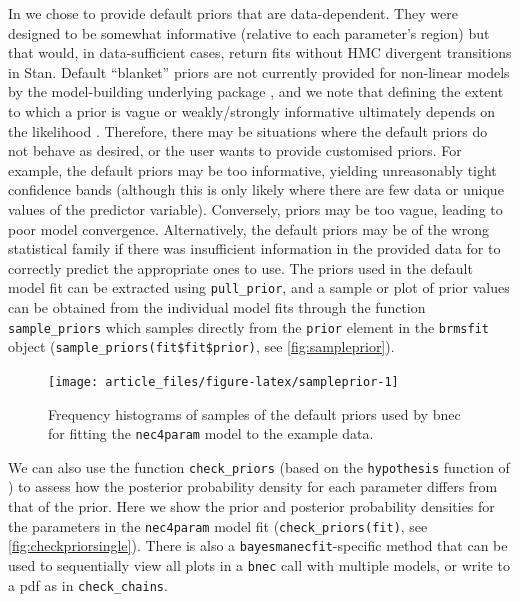 \documentclass[
  shortnames]{jss}
\begin{document}
In  we chose to provide default priors that are data-dependent. They were designed to be somewhat informative (relative to each parameter's region) but that would, in data-sufficient cases, return fits without HMC divergent transitions in Stan. Default ``blanket'' priors are not currently provided for non-linear models by the model-building underlying package , and we note that defining the extent to which a prior is vague or weakly/strongly informative ultimately depends on the likelihood \citep{gelman2017entropy}. Therefore, there may be situations where the default  priors do not behave as desired, or the user wants to provide customised priors. For example, the default priors may be too informative, yielding unreasonably tight confidence bands (although this is only likely where there are few data or unique values of the predictor variable). Conversely, priors may be too vague, leading to poor model convergence. Alternatively, the default priors may be of the wrong statistical family if there was insufficient information in the provided data for  to correctly predict the appropriate ones to use. The priors used in the default model fit can be extracted using \texttt{pull\_prior}, and a sample or plot of prior values can be obtained from the individual  model fits through the function \texttt{sample\_priors} which samples directly from the \texttt{prior} element in the \texttt{brmsfit} object (\texttt{sample\_priors(fit\$fit\$prior)}, see \autoref{fig:sampleprior}).

\begin{CodeChunk}
\begin{figure}[!ht]

{\centering \texttt{[image: article\_files/figure-latex/sampleprior-1]} 

}

\caption[Frequency histograms of samples of the default priors used by bnec for fitting the \texttt{nec4param} model to the example data]{Frequency histograms of samples of the default priors used by bnec for fitting the \texttt{nec4param} model to the example data.}\label{fig:sampleprior}
\end{figure}
\end{CodeChunk}

We can also use the function \texttt{check\_priors} (based on the \texttt{hypothesis} function of ) to assess how the posterior probability density for each parameter differs from that of the prior. Here we show the prior and posterior probability densities for the parameters in the \texttt{nec4param} model fit (\texttt{check\_priors(fit)}, see \autoref{fig:checkpriorsingle}). There is also a \texttt{bayesmanecfit}-specific method that can be used to sequentially view all plots in a \texttt{bnec} call with multiple models, or write to a pdf as in \texttt{check\_chains}.
\end{document}
